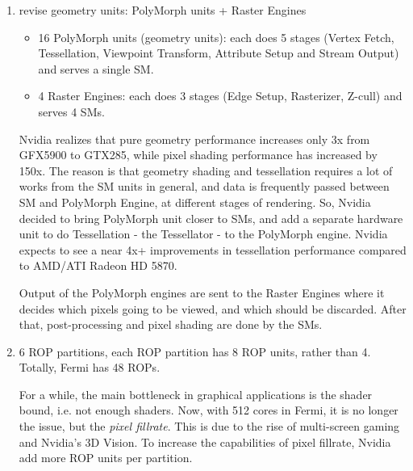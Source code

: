\begin{enumerate}
\item revise geometry units: PolyMorph units + Raster Engines
  \begin{itemize}
  \item 16 PolyMorph units (geometry units): each does 5 stages
    (Vertex Fetch, Tessellation, Viewpoint Transform, Attribute Setup
    and Stream Output) and serves a single SM. 
  \item 4 Raster Engines: each does 3 stages (Edge Setup, Rasterizer,
    Z-cull) and serves 4 SMs.
  \end{itemize}


  \begin{framed}
    Nvidia realizes that pure geometry performance increases only 3x
    from GFX5900 to GTX285, while pixel shading performance has
    increased by 150x. The reason is that geometry shading and
    tessellation requires a lot of works from the SM units in general,
    and data is frequently passed between SM and PolyMorph Engine, at
    different stages of rendering. So, Nvidia decided to bring
    PolyMorph unit closer to SMs, and add a separate hardware unit to
    do Tessellation - the Tessellator - to the PolyMorph
    engine. Nvidia expects to see a near 4x+ improvements in
    tessellation performance compared to AMD/ATI Radeon HD 5870.
  \end{framed}

  \begin{framed}
    Output of the PolyMorph engines are sent to the Raster Engines
    where it decides which pixels going to be viewed, and which should
    be discarded. After that, post-processing and pixel shading are
    done by the SMs.

  \end{framed}

\item 6 ROP partitions, each ROP partition has 8 ROP units, rather
  than 4. Totally, Fermi has 48 ROPs. 
  \begin{framed}
    For a while, the main bottleneck in graphical applications is the
    shader bound, i.e. not enough shaders. Now, with 512 cores in
    Fermi, it is no longer the issue, but the {\it pixel
      fillrate}.
    This is due to the rise of multi-screen gaming and Nvidia's 3D
    Vision. To increase the capabilities of pixel fillrate, Nvidia add
    more ROP units per partition.
  \end{framed}

\end{enumerate}

